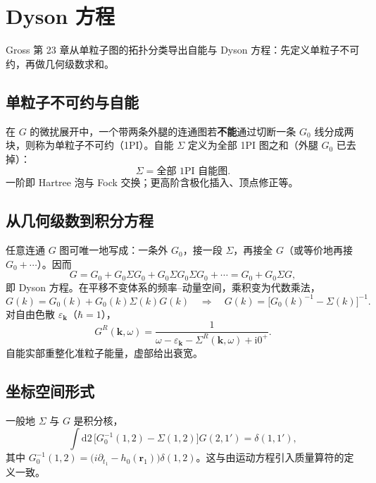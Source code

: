 \section{Dyson 方程}

Gross 第 23 章从单粒子图的拓扑分类导出自能与 Dyson 方程：先定义单粒子不可约，再做几何级数求和。

\subsection{单粒子不可约与自能}

在 $G$ 的微扰展开中，一个带两条外腿的连通图若\textbf{不能}通过切断一条 $G_0$ 线分成两块，则称为单粒子不可约（1PI）。自能 $\Sigma$ 定义为全部 1PI 图之和（外腿 $G_0$ 已去掉）：
\begin{equation}
  \Sigma
  =\text{全部 1PI 自能图}.
\end{equation}
一阶即 Hartree 泡与 Fock 交换；更高阶含极化插入、顶点修正等。

\subsection{从几何级数到积分方程}

任意连通 $G$ 图可唯一地写成：一条外 $G_0$，接一段 $\Sigma$，再接全 $G$（或等价地再接 $G_0+\cdots$）。因而
\begin{equation}
  G
  =G_0+G_0\Sigma G_0+G_0\Sigma G_0\Sigma G_0+\cdots
  =G_0+G_0\Sigma G,
\label{eq:Dyson}
\end{equation}
即 Dyson 方程。在平移不变体系的频率--动量空间，乘积变为代数乘法，
\begin{equation}
  G(k)=G_0(k)+G_0(k)\Sigma(k)G(k)
  \quad\Rightarrow\quad
  G(k)=\bigl[G_0(k)^{-1}-\Sigma(k)\bigr]^{-1}.
\end{equation}
对自由色散 $\varepsilon_{\mathbf{k}}$（$\hbar=1$），
\begin{equation}
  G^R(\mathbf{k},\omega)
  =\frac{1}{\omega-\varepsilon_{\mathbf{k}}-\Sigma^R(\mathbf{k},\omega)+\mathrm{i}0^+}.
\end{equation}
自能实部重整化准粒子能量，虚部给出衰宽。

\subsection{坐标空间形式}

一般地 $\Sigma$ 与 $G$ 是积分核，
\begin{equation}
  \int\mathrm{d}2\,
  \bigl[
  G_0^{-1}(1,2)-\Sigma(1,2)
  \bigr]
  G(2,1')
  =\delta(1,1'),
\end{equation}
其中 $G_0^{-1}(1,2)=\bigl(i\partial_{t_1}-h_0(\mathbf{r}_1)\bigr)\delta(1,2)$。这与由运动方程引入质量算符的定义一致。

